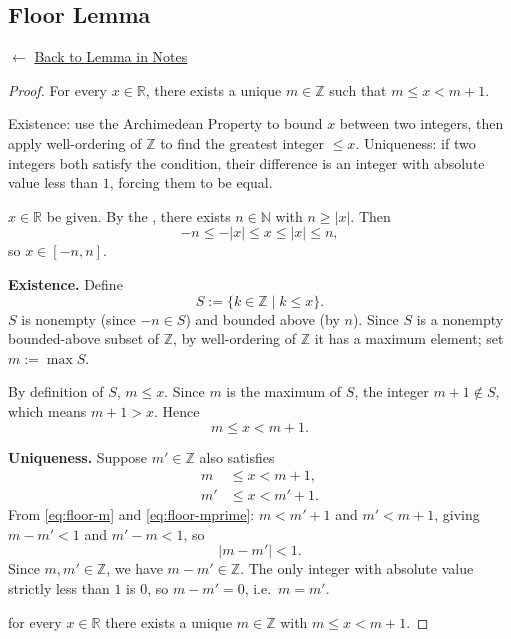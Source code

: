 
\subsection*{Floor Lemma}
\label{prf:floor-lemma}

\begin{remark*}[Return]
$\leftarrow$ \hyperref[lem:floor-lemma]{Back to Lemma in Notes}
\end{remark*}

\begin{proof}
\Claim For every $x \in \mathbb{R}$, there exists a unique $m \in \mathbb{Z}$
such that $m \leq x < m+1$.

\Strategy
Existence: use the Archimedean Property to bound $x$ between two integers,
then apply well-ordering of $\mathbb{Z}$ to find the greatest integer $\leq x$.
Uniqueness: if two integers both satisfy the condition, their difference
is an integer with absolute value less than $1$, forcing them to be equal.

\medskip
\Let $x \in \mathbb{R}$ be given.
By the , there exists $n \in \mathbb{N}$
with $n \geq |x|$. Then
\[
  -n \leq -|x| \leq x \leq |x| \leq n,
\]
so $x \in [-n, n]$.

\medskip
\textbf{Existence.}
Define
\[
  S := \{ k \in \mathbb{Z} \mid k \leq x \}.
\]
$S$ is nonempty (since $-n \in S$) and bounded above (by $n$).
Since $S$ is a nonempty bounded-above subset of $\mathbb{Z}$,
by well-ordering of $\mathbb{Z}$ it has a maximum element; set $m := \max S$.

By definition of $S$, $m \leq x$.
Since $m$ is the maximum of $S$, the integer $m+1 \notin S$,
which means $m+1 > x$. Hence
\[
  m \leq x < m+1.
\]

\medskip
\textbf{Uniqueness.}
Suppose $m' \in \mathbb{Z}$ also satisfies
\begin{align}
  m  &\leq x < m  + 1, \label{eq:floor-m} \\
  m' &\leq x < m' + 1. \label{eq:floor-mprime}
\end{align}
From \eqref{eq:floor-m} and \eqref{eq:floor-mprime}:
$m < m'+1$ and $m' < m+1$, giving $m - m' < 1$ and $m' - m < 1$, so
\[
  |m - m'| < 1.
\]
Since $m, m' \in \mathbb{Z}$, we have $m - m' \in \mathbb{Z}$.
The only integer with absolute value strictly less than $1$ is $0$,
so $m - m' = 0$, i.e.\ $m = m'$.

\Hence for every $x \in \mathbb{R}$ there exists a unique $m \in \mathbb{Z}$
with $m \leq x < m+1$. \AsReq
\end{proof}

